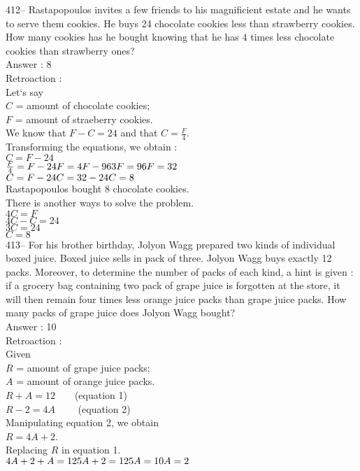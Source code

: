 ﻿\documentclass[letterpaper, 12pt]{article}
\begin{document}
412-- Rastapopoulos invites a few friends to his magnificient estate and he wants to serve them cookies. He buys 24 chocolate cookies less than strawberry cookies. How many cookies has he bought knowing that he has 4 times less chocolate cookies than strawberry ones?\\

Answer : 8\\

Retroaction : \\
Let`s say\\
$C$ = amount of chocolate cookies;\\
$F$ = amount of straeberry cookies.\\
We know that $F-C=24$ and that $C=\frac{F}{4}$.\\
Transforming the equations, we obtain :\\
$C=F-24$\\
$\frac{F}{4}=F-24\\
F=4F-96\\
3F=96\\
F=32$\\

$C=F-24\\
C=32-24\\
C=8$\\
Rastapopoulos bought 8 chocolate cookies.\\

There is another ways to solve the problem.\\
$4C=F$\\
$4C-C=24$\\
$3C=24$\\
$C=8$\\


413-- For his brother birthday, Jolyon Wagg prepared two kinds of individual boxed juice. Boxed juice sells in pack of three.  Jolyon Wagg buys exactly 12 packs. Moreover, to determine the number of packs of each kind, a hint is given : if a grocery bag containing two pack of grape juice is forgotten at the store, it will then remain four times less orange juice packs than grape juice packs. How many packs of grape juice does Jolyon Wagg bought?\\

Answer : 10\\

Retroaction : \\
Given\\
$R$ = amount of grape juice packs;\\
$A$ = amount of orange juice packs.\\
$R+A=12  \qquad$(equation 1)\\
$R-2=4A \qquad$ (equation 2)\\
Manipulating equation 2, we obtain\\
$R=4A+2$.\\
Replacing $R$ in equation 1.\\
$4A+2+A=12\\
5A+2=12\\
5A=10\\
A=2$\\
\end{document}
